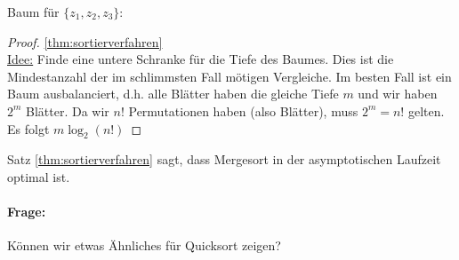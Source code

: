\begin{example}
Baum für $\{z_1,z_2,z_3\}$: \\
\begin{center}
\end{center}
\end{example}
\begin{proof}
\ref{thm:sortierverfahren} \\
\underline{Idee:} Finde eine untere Schranke für die Tiefe des Baumes. Dies ist die Mindestanzahl der im schlimmsten Fall mötigen Vergleiche.
Im besten Fall ist ein Baum ausbalanciert, d.h. alle Blätter haben die gleiche Tiefe $m$ und wir haben $2^{m}$ Blätter. Da wir $n!$ Permutationen haben (also Blätter), muss $2^{m}=n!$ gelten. Es folgt $m \log_2(n!)$
\end{proof}
Satz \ref{thm:sortierverfahren} sagt, dass Mergesort in der asymptotischen Laufzeit optimal ist. 
\paragraph{Frage:} Können wir etwas Ähnliches für Quicksort zeigen?

